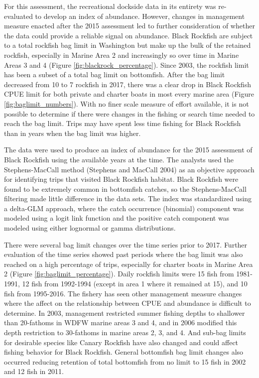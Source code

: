 \documentclass[11pt,
  english,
  letterpaper,
]{article}
\begin{document}
For this assessment, the recreational dockside data in its entirety was re-evaluated to develop an index of abundance. However, changes in management measure enacted after the 2015 assessment led to further consideration of whether the data could provide a reliable signal on abundance. Black Rockfish are subject to a total rockfish bag limit in Washington but make up the bulk of the retained rockfish, especially in Marine Area 2 and increasingly so over time in Marine Areas 3 and 4 (Figure \ref{fig:blackrock_percentage}). Since 2003, the rockfish limit has been a subset of a total bag limit on bottomfish. After the bag limit decreased from 10 to 7 rockfish in 2017, there was a clear drop in Black Rockfish CPUE limit for both private and charter boats in most every marine area (Figure \ref{fig:baglimit_numbers}). With no finer scale measure of effort available, it is not possible to determine if there were changes in the fishing or search time needed to reach the bag limit. Trips may have spent less time fishing for Black Rockfish than in years when the bag limit was higher.

The data were used to produce an index of abundance for the 2015 assessment of Black Rockfish using the available years at the time. The analysts used the Stephens-MacCall method (Stephens and MacCall 2004) as an objective approach for identifying trips that visited Black Rockfish habitat. Black Rockfish were found to be extremely common in bottomfish catches, so the Stephens-MacCall filtering made little difference in the data sets. The index was standardized using a delta-GLM approach, where the catch occurrence (binomial) component was modeled using a logit link function and the positive catch component was modeled using either lognormal or gamma distributions.

There were several bag limit changes over the time series prior to 2017. Further evaluation of the time series showed past periods where the bag limit was also reached on a high percentage of trips, especially for charter boats in Marine Area 2 (Figure \ref{fig:baglimit_percentage}). Daily rockfish limits were 15 fish from 1981-1991, 12 fish from 1992-1994 (except in area 1 where it remained at 15), and 10 fish from 1995-2016. The fishery has seen other management measure changes where the affect on the relationship between CPUE and abundance is difficult to determine. In 2003, management restricted summer fishing depths to shallower than 20-fathoms in WDFW marine areas 3 and 4, and in 2006 modified this depth restriction to 30-fathoms in marine areas 2, 3, and 4. And sub-bag limits for desirable species like Canary Rockfish have also changed and could affect fishing behavior for Black Rockfish. General bottomfish bag limit changes also occurred reducing retention of total bottomfish from no limit to 15 fish in 2002 and 12 fish in 2011.
\end{document}
